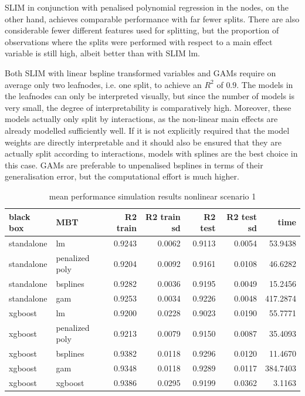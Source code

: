 SLIM in conjunction with penalised polynomial regression in the nodes, on the other hand, achieves comparable performance with far fewer splits.
There are also considerable fewer different features used for splitting, but the proportion of observations where the splits were performed with respect to a main effect variable is still high, albeit better than with SLIM lm.

Both SLIM with linear bspline transformed variables and GAMs require on average only two leafnodes, i.e. one split, to achieve an $R^2$ of $0.9$. The models in the leafnodes can only be interpreted visually, but since the number of models is very small, the degree of interpretability is comparatively high. Moreover, these models actually only split by interactions, as the non-linear main effects are already modelled sufficiently well. If it is not explicitly required that the model weights are directly interpretable and it should also be ensured that they are actually split according to interactions, models with splines are the best choice in this case. GAMs are preferable to unpenalised bsplines in terms of their generalisation error, but the computational effort is much higher.




\begin{table}[!htb]

\centering \tiny
\begin{tabular}[t]{l|l|r|r|r|r|r}
\hline
black box & MBT & R2 train & R2 train sd & R2 test & R2 test sd & time\\
\hline
standalone & lm & 0.9243 & 0.0062 & 0.9113 & 0.0054 & 53.9438\\
standalone & penalized poly & 0.9204 & 0.0092 & 0.9161 & 0.0108 & 46.6282\\
standalone & bsplines & 0.9282 & 0.0036 & 0.9195 & 0.0049 & 15.2456\\
standalone & gam & 0.9253 & 0.0034 & 0.9226 & 0.0048 & 417.2874\\
\hline
xgboost & lm & 0.9200 & 0.0228 & 0.9023 & 0.0190 & 55.7771\\
xgboost & penalized poly & 0.9213 & 0.0079 & 0.9150 & 0.0087 & 35.4093\\
xgboost & bsplines & 0.9382 & 0.0118 & 0.9296 & 0.0120 & 11.4670\\
xgboost & gam & 0.9348 & 0.0118 & 0.9289 & 0.0117 & 384.7403\\
\hline
xgboost & xgboost & 0.9386 & 0.0295 & 0.9199 & 0.0362 & 3.1163\\
\hline
\end{tabular}
\caption{mean performance simulation results nonlinear scenario 1}

\end{table}




